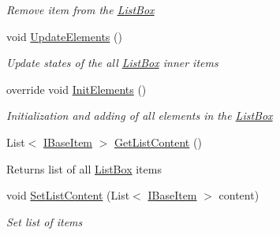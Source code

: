 \begin{DoxyCompactItemize}
\begin{DoxyCompactList}\small\item\em Remove item from the \mbox{\hyperlink{class_space_v_i_l_1_1_list_box}{List\+Box}} \end{DoxyCompactList}\item 
void \mbox{\hyperlink{class_space_v_i_l_1_1_list_box_aeef6380f4eff45ac43737fbc42dcf2e1}{Update\+Elements}} ()
\begin{DoxyCompactList}\small\item\em Update states of the all \mbox{\hyperlink{class_space_v_i_l_1_1_list_box}{List\+Box}} inner items \end{DoxyCompactList}\item 
override void \mbox{\hyperlink{class_space_v_i_l_1_1_list_box_a6fd8d4f254ff3954eb217cda21ebca45}{Init\+Elements}} ()
\begin{DoxyCompactList}\small\item\em Initialization and adding of all elements in the \mbox{\hyperlink{class_space_v_i_l_1_1_list_box}{List\+Box}} \end{DoxyCompactList}\item 
\mbox{\label{class_space_v_i_l_1_1_list_box_a4a976ba0eb5c6ef215d6f555654b61ec}} 
List$<$ \mbox{\hyperlink{interface_space_v_i_l_1_1_core_1_1_i_base_item}{I\+Base\+Item}} $>$ \mbox{\hyperlink{class_space_v_i_l_1_1_list_box_a4a976ba0eb5c6ef215d6f555654b61ec}{Get\+List\+Content}} ()
\begin{DoxyCompactList}\small\item\em \begin{DoxyReturn}{Returns}
list of all \mbox{\hyperlink{class_space_v_i_l_1_1_list_box}{List\+Box}} items 
\end{DoxyReturn}
\end{DoxyCompactList}\item 
void \mbox{\hyperlink{class_space_v_i_l_1_1_list_box_a792815a7711ae04ad8ea461b2685615e}{Set\+List\+Content}} (List$<$ \mbox{\hyperlink{interface_space_v_i_l_1_1_core_1_1_i_base_item}{I\+Base\+Item}} $>$ content)
\begin{DoxyCompactList}\small\item\em Set list of items \end{DoxyCompactList}\item 
\mbox{\label{class_space_v_i_l_1_1_list_box_a40a4048d563693bb7d7dae2fe73e9150}} 

\end{DoxyCompactItemize}
